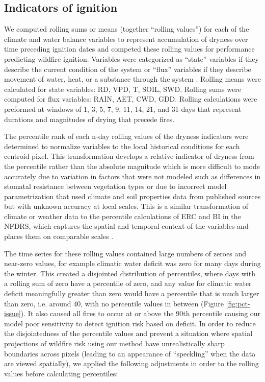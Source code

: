 \documentclass[11p]{article}
\begin{document}
\begin{table}
{\subsection{Indicators of ignition}

We computed rolling sums or means (together ``rolling values'') for each of the climate and water balance variables to represent accumulation of dryness over time preceding ignition dates and competed these rolling values for performance predicting wildfire ignition. Variables were categorized as ``state'' variables if they describe the current condition of the system or ``flux'' variables if they describe movement of water, heat, or a substance through the system \citep{wangInterplaysStateFlux2019,dingmanPhysicalHydrology2015}. Rolling means were calculated for state variables: RD, VPD, T, SOIL, SWD. Rolling sums were computed for flux variables: RAIN, AET, CWD, GDD. Rolling calculations were preformed at windows of 1, 3, 5, 7, 9, 11, 14, 21, and 31 days that represent durations and magnitudes of drying that precede fires.

The percentile rank of each n-day rolling values of the dryness indicators were determined to normalize variables to the local historical conditions for each centroid pixel. This transformation develops a relative indicator of dryness from the percentile rather than the absolute magnitude which is more difficult to mode accurately due to variation in factors that were not modeled such as differences in stomatal resistance between vegetation types or due to incorrect model parametrization that used climate and soil properties data from published sources but with unknown accuracy at local scales. This is a similar transformation of climate or weather data to the percentile calculations of ERC and BI in the NFDRS, which captures the spatial and temporal context of the variables and places them on comparable scales \citep{jollySevereFireDanger2019}.

The time series for these rolling values contained large numbers of zeroes and near-zero values, for example climatic water deficit was zero for many days during the winter. This created a disjointed distribution of percentiles, where days with a rolling sum of zero have a percentile of zero, and any value for climatic water deficit meaningfully greater than zero would have a percentile that is much larger than zero, i.e. around 40, with no percentile values in between (Figure \ref{fig:pct-issue}). It also caused all fires to occur at or above the 90th percentile causing our model poor sensitivity to detect ignition risk based on deficit. In order to reduce the disjointedness of the percentile values and prevent a situation where spatial projections of wildfire risk using our method have unrealistically sharp boundaries across pixels (leading to an appearance of ``speckling'' when the data are viewed spatially), we applied the following adjustments in order to the rolling values before calculating percentiles:

}
\end{table}
\end{document}
